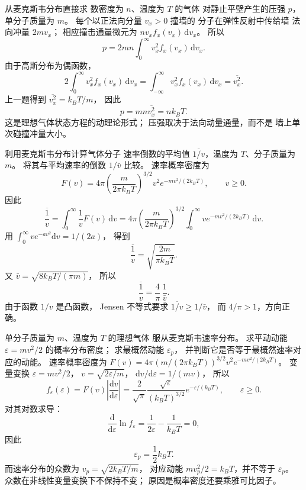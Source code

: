 从麦克斯韦分布直接求
数密度为 $n$、温度为 $T$ 的气体
对静止平壁产生的压强 $p$，
单分子质量为 $m$。
\exsolution
每个以正法向分量 $v_x>0$ 撞墙的
分子在弹性反射中传给墙
法向冲量 $2mv_x$；
相应撞击通量微元为
$n v_x f_x(v_x)\,\mathrm dv_x$。
所以
\[
p=2mn\int_0^\infty v_x^2 f_x(v_x)\,\mathrm dv_x.
\]
由于高斯分布为偶函数，
\[
2\int_0^\infty v_x^2 f_x(v_x)\,\mathrm dv_x
=\int_{-\infty}^\infty v_x^2 f_x(v_x)\,\mathrm dv_x
=\overline{v_x^2}.
\]
上一题得到
$\overline{v_x^2}=k_BT/m$，
因此
\[
\boxed{p=mn\overline{v_x^2}=nk_BT}.
\]
\excheck 这是理想气体状态方程的动理论形式；
压强取决于法向动量通量，而不是
墙上单次碰撞冲量大小。

利用麦克斯韦分布计算气体分子
速率倒数的平均值
$\overline{1/v}$，温度为 $T$、分子质量为 $m$。
将其与平均速率的倒数 $1/\bar v$ 比较。
\exsolution
速率概率密度为
\[
F(v)=4\pi\left(\frac{m}{2\pi k_BT}\right)^{3/2}
v^2e^{-mv^2/(2k_BT)},\qquad v\ge0.
\]
因此
\[
\overline{\frac1v}=\int_0^\infty
\frac1vF(v)\,\mathrm dv
=4\pi\left(\frac m{2\pi k_BT}\right)^{3/2}
\int_0^\infty ve^{-mv^2/(2k_BT)}\,\mathrm dv.
\]
用
$\int_0^\infty ve^{-av^2}\mathrm dv=1/(2a)$，
得到
\[
\boxed{\overline{\frac1v}=
\sqrt{\frac{2m}{\pi k_BT}}}.
\]
又
$\bar v=\sqrt{8k_BT/(\pi m)}$，
所以
\[
\boxed{\overline{\frac1v}
=\frac4\pi\,\frac1{\bar v}}.
\]
\excheck 由于函数 $1/v$ 是凸函数，
Jensen 不等式要求
$\overline{1/v}\ge1/\bar v$，
而 $4/\pi>1$，方向正确。

单分子质量为 $m$、温度为 $T$ 的理想气体
服从麦克斯韦速率分布。
求平动动能 $\varepsilon=mv^2/2$ 的概率分布密度；
求最概然动能 $\varepsilon_p$，
并判断它是否等于最概然速率对应的动能。
\exsolution
速率概率密度为
$F(v)=4\pi(m/(2\pi k_BT))^{3/2}v^2
e^{-mv^2/(2k_BT)}$。
变量变换
$\varepsilon=mv^2/2$，
$v=\sqrt{2\varepsilon/m}$，
$\mathrm dv/\mathrm d\varepsilon=1/(mv)$，
所以
\[
f_\varepsilon(\varepsilon)=
F(v)\left|\frac{\mathrm dv}{\mathrm d\varepsilon}\right|
=\boxed{\frac2{\sqrt\pi}
\frac{\sqrt\varepsilon}{(k_BT)^{3/2}}
e^{-\varepsilon/(k_BT)}},
\qquad\varepsilon\ge0.
\]
对其对数求导：
\[
\frac{\mathrm d}{\mathrm d\varepsilon}\ln f_\varepsilon
=\frac1{2\varepsilon}-\frac1{k_BT}=0,
\]
因此
\[
\boxed{\varepsilon_p=\frac12k_BT}.
\]
而速率分布的众数为
$v_p=\sqrt{2k_BT/m}$，
对应动能
$mv_p^2/2=k_BT$，并不等于 $\varepsilon_p$。
\excheck 众数在非线性变量变换下不保持不变；
原因是概率密度还要乘雅可比因子。

